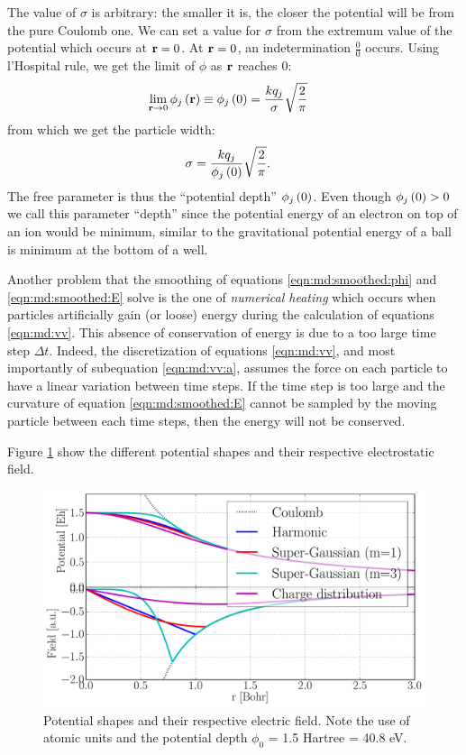 The value of $\sigma$ is arbitrary: the smaller it is, the closer the potential
will be from the pure Coulomb one. We can set a value for $\sigma$ from the
extremum value of the potential which occurs at $\textbf{r} = 0$. At $\textbf{r} = 0$, an
indetermination $\frac{0}{0}$ occurs. Using l'Hospital rule, we get the limit
of $\phi$ as $\textbf{r}$ reaches 0:
\begin{align}
\lim_{\textbf{r} \rightarrow 0} \phi_j\left( \textbf{r} \right)
    & \equiv \phi_j\left( 0 \right) = \frac{ k q_j }{ \sigma } \sqrt{\frac{2}{\pi}}
\end{align}
from which we get the particle width:
\begin{align}
\sigma & = \frac{ k q_j }{ \phi_j\left( 0 \right) } \sqrt{ \frac{2}{\pi}}.
\label{eqn:md:sigma}
\end{align}
The free parameter is thus the ``potential depth'' $\phi_j\left( 0 \right)$. Even
though $\phi_j\left( 0 \right) > 0$ we call this parameter ``depth'' since the potential
energy of an electron on top of an ion would be minimum, similar to the
gravitational potential energy of a ball is minimum at the bottom of a well.

Another problem that the smoothing of equations \eqref{eqn:md:smoothed:phi} and
\eqref{eqn:md:smoothed:E} solve is the one of \textit{numerical heating} which
occurs when particles artificially gain (or loose) energy during the
calculation of equations \eqref{eqn:md:vv}. This absence of conservation of
energy is due to a too large time step $\Delta t$. Indeed, the
discretization of equations \eqref{eqn:md:vv}, and most importantly of
subequation \eqref{eqn:md:vv:a}, assumes the force on each particle to have a
linear variation between time steps. If the time step is too large and the
curvature of equation \eqref{eqn:md:smoothed:E} cannot be sampled by the moving
particle between each time steps, then the energy will not be conserved.



Figure \ref{fig:potential:shapes} show the different potential shapes and their
respective electrostatic field.

\begin{figure}
 \centering
 \includegraphics[width=\figurewidth]{figures/potential_shapes}
 \caption{\label{fig:potential:shapes}Potential shapes and their respective
          electric field. Note the use of atomic units and the potential depth
          $\phi_0$ = 1.5 Hartree = 40.8 eV.}
\end{figure}

